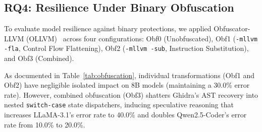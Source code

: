 \documentclass[conference]{IEEEtran}
\begin{document}
\begin{table}[h]
\centering
\caption{McNemar's Test for Paired Context Differences (CT1 vs CT2/CT3).}
\label{tab:mcnemar}
\end{table}

\subsection{RQ4: Resilience Under Binary Obfuscation}
To evaluate model resilience against binary protections, we applied Obfuscator-LLVM (OLLVM)~\cite{junod2015ollvm} across four configurations: Obf0 (Unobfuscated), Obf1 (\texttt{-mllvm -fla}, Control Flow Flattening), Obf2 (\texttt{-mllvm -sub}, Instruction Substitution), and Obf3 (Combined).

As documented in Table~\ref{tab:obfuscation}, individual transformations (Obf1 and Obf2) have negligible isolated impact on 8B models (maintaining a 30.0\% error rate). However, combined obfuscation (Obf3) shatters Ghidra's AST recovery into nested \texttt{switch-case} state dispatchers, inducing speculative reasoning that increases LLaMA-3.1's error rate to 40.0\% and doubles Qwen2.5-Coder's error rate from 10.0\% to 20.0\%.
\end{document}

